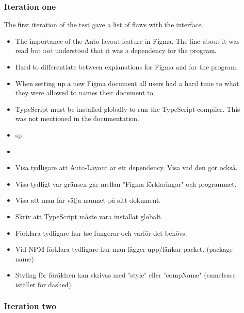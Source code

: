 \subsubsection{Iteration one}%
\label{ssub:Iteration one}
The first iteration of the test gave a list of flaws with the interface.
\begin{itemize}
   \item The importance of the Auto-layout feature in Figma. The line about it was read but not understood that it was a dependency for the program. 
   \item Hard to differentiate between explanations for Figma and for the program.
   \item When setting up a new Figma document all users had a hard time to what they were allowed to names their document to.
   \item TypeScript must be installed globally to run the TypeScript compiler. This was not mentioned in the documentation. 
   \item sp
\end{itemize}


\begin{itemize}
   \item 
   \item Visa tydligare att Auto-Layout är ett dependency. Visa vad den gör också.
   \item Visa tydligt var gränsen går mellan "Figma förklaringar" och programmet.
   \item Visa att man får välja namnet på sitt dokument.
   \item Skriv att TypeScript måste vara installat globalt.
   \item Förklara tydligare hur tsc fungerar och varför det behövs.
   \item Vid NPM förklara tydligare hur man lägger upp/länkar packet. (package-name)
   \item Styling för föräldren kan skrivas med "style" eller "compName" (camelcase istället för dashed)
\end{itemize}

\subsubsection{Iteration two}%
\label{ssub:Iteration two}




